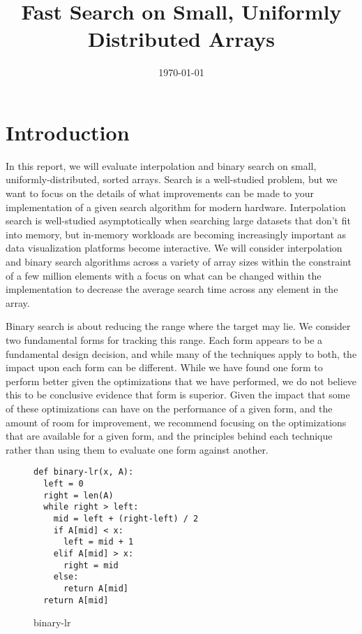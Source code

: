 \documentclass{article}
\title{Fast Search on Small, Uniformly Distributed Arrays}
\date{\today}
\begin{document}


\section{Introduction}
In this report, we will evaluate interpolation and binary search on small,
uniformly-distributed, sorted arrays. Search is a well-studied problem, but
we want to focus on the details of what improvements can be made to your
implementation of a given search algorithm for modern hardware. Interpolation
search is well-studied asymptotically when searching large datasets that don't
fit into memory, but in-memory workloads are becoming increasingly important
as data visualization platforms become interactive. We will consider
interpolation and binary search algorithms across a variety of array sizes
within the constraint of a few million elements with a focus on what can be
changed within the implementation to decrease the average search time across
any element in the array.

Binary search is about reducing the range where the target may lie. We consider
two fundamental forms for tracking this range. Each form appears to be a
fundamental design decision, and while many of the techniques apply to both,
the impact upon each form can be different. While we have found one form to
perform better given the optimizations that we have performed, we do not believe
this to be conclusive evidence that form is superior. Given the impact that some
of these optimizations can have on the performance of a given form, and the
amount of room for improvement, we recommend focusing on the optimizations that
are available for a given form, and the principles behind each technique rather
than using them to evaluate one form against another.

\begin{figure}[h]
\begin{verbatim}
def binary-lr(x, A):
  left = 0
  right = len(A)
  while right > left:
    mid = left + (right-left) / 2
    if A[mid] < x:
      left = mid + 1
    elif A[mid] > x:
      right = mid 
    else:
      return A[mid]
  return A[mid]
\end{verbatim}
\caption{binary-lr}
\end{figure}
\end{document}
